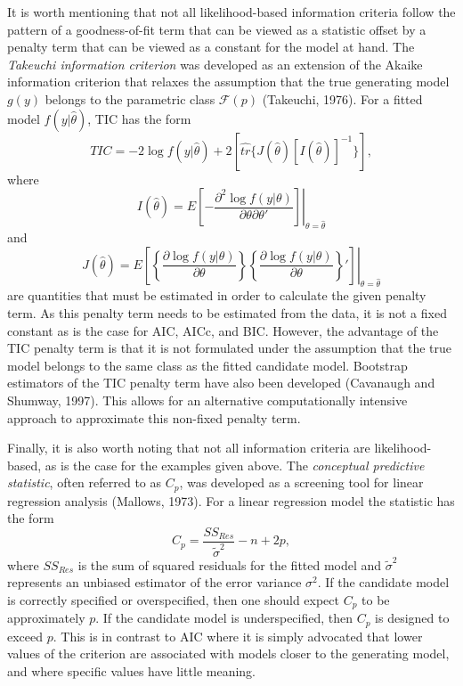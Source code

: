 		It is worth mentioning that not all likelihood-based information criteria follow the pattern of a goodness-of-fit term that can be viewed as a statistic offset by a penalty term that
		can be viewed as a constant for the model at hand. The \textit{Takeuchi information criterion} was developed as an extension of the Akaike information criterion that relaxes the
		assumption that the true generating model $g(y)$ belongs to the parametric class $\mathcal{F}(p)$ (Takeuchi, 1976). For a fitted model $f(y|\hat{\theta})$, TIC has the form
		\begin{equation*}
			TIC = -2 \log f(y|\hat{\theta}) + 2 \left[ \hat{tr} \{ J(\hat{\theta}) [I(\hat{\theta})]^{-1} \} \right] ,
		\end{equation*}
		where
		\begin{equation*}
			I(\hat{\theta}) = E \left. \left[ -\frac{\partial^2 \log f(y|\theta)}{\partial \theta \partial \theta '} \right] \right|_{\theta = \hat{\theta}}
		\end{equation*}
		and
		\begin{equation*}
			J(\hat{\theta}) = E \left. \left[ \left\{ \frac{\partial \log f(y|\theta)}{\partial \theta} \right\} \left\{ \frac{\partial \log f(y|\theta)}{\partial \theta} \right\}'  \right] \right|_{\theta = \hat{\theta}}
		\end{equation*}
		are quantities that must be estimated in order to calculate the given penalty term. As this penalty term needs to be estimated from the data, it is not a fixed constant as is the case
		for AIC, AICc, and BIC. However, the advantage of the TIC penalty term is that it is not formulated under the assumption that the true model belongs to the same class as the fitted candidate
		model. Bootstrap estimators of the TIC penalty term have also been developed (Cavanaugh and Shumway, 1997). This allows for an alternative computationally intensive approach to approximate this non-fixed penalty term.

		Finally, it is also worth noting that not all information criteria are likelihood-based, as is the case for the examples given above. The \textit{conceptual predictive statistic}, often
		referred to as $C_p$, was developed as a screening tool for linear regression analysis (Mallows, 1973). For a linear regression model the statistic has the form
		\begin{equation*}
			C_p = \frac{SS_{Res}}{\tilde{\sigma}^2} - n + 2p ,
		\end{equation*}
		where $SS_{Res}$ is the sum of squared residuals for the fitted model and $\tilde{\sigma}^2$ represents an unbiased estimator of the error variance $\sigma^2$. If the candidate model is correctly
		specified or overspecified, then one should expect $C_p$ to be approximately $p$. If the candidate model is underspecified, then $C_p$ is designed to exceed $p$. This is in contrast to AIC
		where it is simply advocated that lower values of the criterion are associated with models closer to the generating model, and where specific values have little meaning.
		
